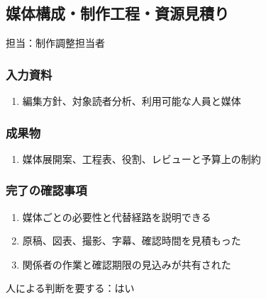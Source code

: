 \documentclass[a4paper,11pt]{article}
\begin{document}
\subsection{媒体構成・制作工程・資源見積り}
\par 担当：制作調整担当者\par\medskip
\subsubsection*{入力資料}
\begin{enumerate}[leftmargin=2em,itemsep=0.35em]
\item 編集方針、対象読者分析、利用可能な人員と媒体
\end{enumerate}
\subsubsection*{成果物}
\begin{enumerate}[leftmargin=2em,itemsep=0.35em]
\item 媒体展開案、工程表、役割、レビューと予算上の制約
\end{enumerate}
\subsubsection*{完了の確認事項}
\begin{enumerate}[leftmargin=2em,itemsep=0.35em]
\item 媒体ごとの必要性と代替経路を説明できる
\item 原稿、図表、撮影、字幕、確認時間を見積もった
\item 関係者の作業と確認期限の見込みが共有された
\end{enumerate}
\par 人による判断を要する：はい\par\medskip
\end{document}
